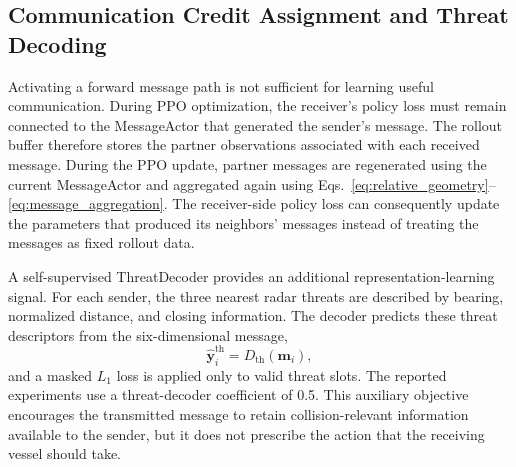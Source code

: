 \documentclass[final,5p,times,twocolumn]{elsarticle}
\begin{document}
\subsection{Communication Credit Assignment and Threat Decoding}
\label{sec:comm_learning}
{\color{red}
Activating a forward message path is not sufficient for learning useful communication. During PPO optimization, the receiver's policy loss must remain connected to the MessageActor that generated the sender's message. The rollout buffer therefore stores the partner observations associated with each received message. During the PPO update, partner messages are regenerated using the current MessageActor and aggregated again using Eqs.~\eqref{eq:relative_geometry}--\eqref{eq:message_aggregation}. The receiver-side policy loss can consequently update the parameters that produced its neighbors' messages instead of treating the messages as fixed rollout data.

A self-supervised ThreatDecoder provides an additional representation-learning signal. For each sender, the three nearest radar threats are described by bearing, normalized distance, and closing information. The decoder predicts these threat descriptors from the six-dimensional message,
\begin{equation}
\widehat{\mathbf{y}}^{\mathrm{th}}_i=D_{\mathrm{th}}(\mathbf{m}_i),
\end{equation}
and a masked $L_1$ loss is applied only to valid threat slots. The reported experiments use a threat-decoder coefficient of 0.5. This auxiliary objective encourages the transmitted message to retain collision-relevant information available to the sender, but it does not prescribe the action that the receiving vessel should take.
}
\end{document}
